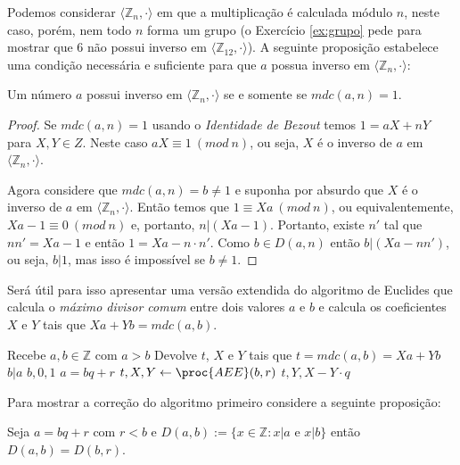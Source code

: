 Podemos considerar $\langle \mathbb{Z}_n, \cdot \rangle$ em que a multiplicação é calculada módulo $n$, neste caso, porém, nem todo $n$ forma um grupo (o Exercício \ref{ex:grupo} pede para mostrar que $6$ não possui inverso em $\langle \mathbb{Z}_{12}, \cdot \rangle$).
A seguinte proposição estabelece uma condição necessária e suficiente para que $a$ possua inverso em $\langle \mathbb{Z}_n, \cdot \rangle$:

\begin{proposition}
Um número $a$ possui inverso em $\langle \mathbb{Z}_n, \cdot \rangle$ se e somente se $mdc(a,n) = 1$.
\end{proposition}
\begin{proof}
  Se $mdc(a, n) = 1$ usando o {\em Identidade de Bezout} temos $1 = aX + nY$ para $X, Y \in Z$.
  Neste caso $aX \equiv 1\ (mod\ n)$, ou seja, $X$ é o inverso de $a$ em $\langle \mathbb{Z}_n, \cdot \rangle$.

Agora considere que $mdc(a, n) = b \neq 1$ e suponha por absurdo que $X$ é o
inverso de $a$ em $\langle \mathbb{Z}_n , \cdot \rangle$. 
Então temos que $1 \equiv Xa\ (mod\ n)$, ou equivalentemente, $Xa - 1 \equiv 0\ (mod\ n)$ e, portanto, $n|(Xa - 1)$.
Portanto, existe $n'$ tal que $nn' = Xa - 1$ e então $1 = Xa - n \cdot n'$. 
Como $b \in D(a,n)$ então $b|(Xa - nn')$, ou seja, $b|1$, mas isso é impossível se $b \neq 1$.
\end{proof}

Será útil para isso apresentar uma versão extendida do algoritmo de Euclides que calcula o {\em máximo divisor comum} entre dois valores $a$ e $b$ e calcula os coeficientes $X$ e $Y$ tais que $Xa + Yb = mdc(a,b)$.

\begin{codebox}
\li \Comment Recebe $a, b \in \mathbb{Z}$ com $a > b$
\li \Comment Devolve $t$, $X$ e $Y$ tais que $t = mdc(a,b) = Xa + Yb$  
\li \If $b|a$
\li     \Then 
        \Return $b, 0, 1$
\Comment $a = bq + r$
\li \Else $t, X, Y \gets \proc{AEE}(b, r)$
\li     \Return $t, Y, X - Y \cdot q$
\End
\end{codebox}

Para mostrar a correção do algoritmo primeiro considere a seguinte proposição:

\begin{proposition}
  Seja $a = bq + r$ com $r < b$ e $D(a, b) := \{ x \in \mathbb{Z} : x|a$ e $x|b \}$ então $D(a,b) = D(b,r)$.
\end{proposition}

